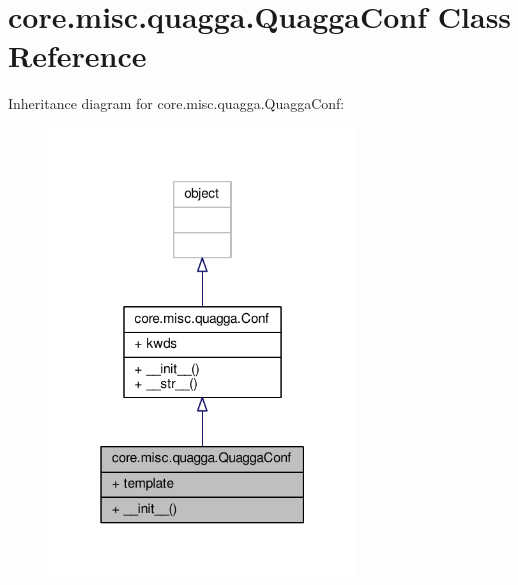 \hypertarget{classcore_1_1misc_1_1quagga_1_1_quagga_conf}{\section{core.\+misc.\+quagga.\+Quagga\+Conf Class Reference}
\label{classcore_1_1misc_1_1quagga_1_1_quagga_conf}
}


Inheritance diagram for core.\+misc.\+quagga.\+Quagga\+Conf\+:
\nopagebreak
\begin{figure}[H]
\begin{center}
\leavevmode
\includegraphics[width=232pt]{classcore_1_1misc_1_1quagga_1_1_quagga_conf__inherit__graph}
\end{center}
\end{figure}


